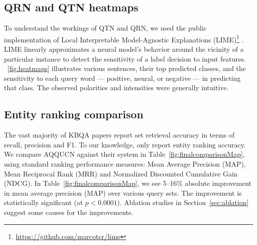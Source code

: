 \documentclass{svjour3}
\begin{document}
\subsection{QRN and QTN heatmaps}

To understand the workings of QTN and QRN, we used the public implementation of 
Local Interpretable Model-Agnostic Explanations (LIME)\footnote{\protect\url{https://github.com/marcotcr/lime}} \citep{lime}. LIME linearly approximates a neural model's behavior around the vicinity of a particular instance to detect the sensitivity of a label decision to input features.  \figurename~\ref{fig:heatmaps} illustrates various sentences, their top predicted classes, and the sensitivity to each query word --- positive, neural, or negative --- in predicting that class.  The observed polarities and intensities were generally intuitive.


\subsection{Entity ranking comparison}

The vast majority of KBQA papers report set retrieval accuracy in terms of recall, precision and F1.  To our knowledge, only \citet{JoshiSC2014KgCorpusJoint} report entity ranking accuracy.  We compare AQQUCN against their system in Table~\ref{fig:finalcomparisonMap}, using standard ranking performance measures: Mean Average Precision (MAP), Mean Reciprocal Rank (MRR) and Normalized Discounted Cumulative Gain (NDCG).  In Table~\ref{fig:finalcomparisonMap}, we see 5--16\% absolute improvement in mean average precision (MAP) over various query sets.  The improvement is statistically significant (at $p < 0.0001$).  Ablation studies in Section~\ref{sec:ablation} suggest some causes for the improvements.
\end{document}
